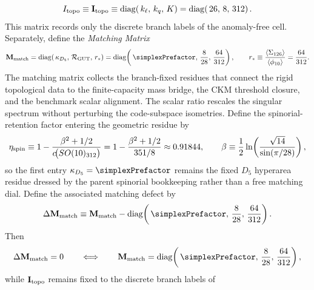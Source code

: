 \documentclass[11pt]{article}
\begin{document}
\begin{equation}
\label{eq:gravity-topological-identity-matrix}
 I_{\rm topo}
 \equiv
 \mathbf I_{\rm topo}
 \equiv
 \operatorname{diag}\!\left(
 \,k_{\ell},
 \,k_q,
 \,K
 \right)
 =
 \operatorname{diag}\!\left(
 \,26,
 \,8,
 \,312
 \right).
\end{equation}
This matrix records only the discrete branch labels of the anomaly-free cell.
Separately, define the \emph{Matching Matrix}
\begin{equation}
\label{eq:gravity-topological-identity-basis}
 \mathbf M_{\rm match}
 =
 \operatorname{diag}\!\left(
 \,\kappa_{D_5},
 \,\mathcal R_{\rm GUT},
 \,r_*
 \right)
 =
 \operatorname{diag}\!\left(
 \,\simplexPrefactor,
 \,\frac{8}{28},
 \,\frac{64}{312}
 \right),
 \qquad
 r_*\equiv\frac{\langle\Sigma_{126}\rangle}{\langle\phi_{10}\rangle}=\frac{64}{312}.
\end{equation}
The matching matrix collects the branch-fixed residues that connect the rigid
topological data to the finite-capacity mass bridge, the CKM threshold
closure, and the benchmark scalar alignment. The scalar ratio rescales the
singular spectrum without perturbing the code-subspace isometries. Define the
spinorial-retention factor entering the geometric residue by
\begin{equation}
\label{eq:gravity-spinorial-retention}
 \eta_{\rm spin}
 \equiv
 1-\frac{\beta^2+1/2}{c\!\bigl(SO(10)_{312}\bigr)}
 =
 1-\frac{\beta^2+1/2}{351/8}
 \approx
 0.91844,
 \qquad
 \beta\equiv \frac12\ln\!\left(\frac{\sqrt{14}}{\sin(\pi/28)}\right),
\end{equation}
so the first entry $\kappa_{D_5}=\simplexPrefactor$ remains the fixed
$D_5$ hyperarea residue dressed by the parent spinorial bookkeeping rather
than a free matching dial. Define the
associated matching defect by
\begin{equation}
\label{eq:gravity-topological-identity-defect}
 \Delta \mathbf M_{\rm match}
 \equiv
 \mathbf M_{\rm match}
 -
 \operatorname{diag}\!\left(
 \,\simplexPrefactor,
 \,\frac{8}{28},
 \,\frac{64}{312}
 \right).
\end{equation}
Then
\begin{equation}
\label{eq:gravity-topological-identity-saturation}
 \Delta \mathbf M_{\rm match}=0
 \qquad\Longleftrightarrow\qquad
 \mathbf M_{\rm match}
 =
 \operatorname{diag}\!\left(
 \,\simplexPrefactor,
 \,\frac{8}{28},
 \,\frac{64}{312}
 \right),
\end{equation}
while $\mathbf I_{\rm topo}$ remains fixed to the discrete branch labels of
\end{document}

